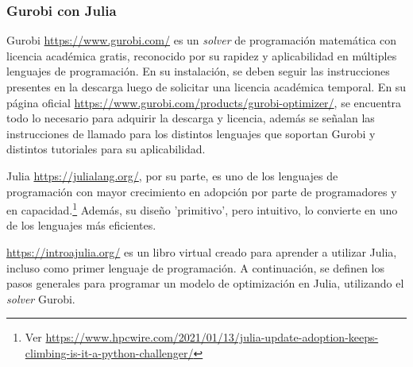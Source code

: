 \subsubsection{Gurobi con Julia}\label{mtjulia}

Gurobi \url{https://www.gurobi.com/} es un \textit{solver} de programación matemática con licencia académica gratis, reconocido por su rapidez y aplicabilidad en múltiples lenguajes de programación. En su instalación, se deben seguir las instrucciones presentes en la descarga luego de solicitar una licencia académica temporal. En su página oficial \url{https://www.gurobi.com/products/gurobi-optimizer/}, se encuentra todo lo necesario para adquirir la descarga y licencia, además se señalan las instrucciones de llamado para los distintos lenguajes que soportan Gurobi y distintos tutoriales para su aplicabilidad.
\vspace{2.5mm}

Julia \url{https://julialang.org/}, por su parte, es uno de los lenguajes de programación con mayor crecimiento en adopción por parte de programadores y en capacidad.\footnote{Ver {\tiny \url{ https://www.hpcwire.com/2021/01/13/julia-update-adoption-keeps-climbing-is-it-a-python-challenger/}}} Además, su diseño 'primitivo', pero intuitivo, lo convierte en uno de los lenguajes más eficientes. 
\vspace{2.5mm}

\url{https://introajulia.org/}  es un libro virtual creado para aprender a utilizar Julia, incluso como primer lenguaje de programación. A continuación, se definen los pasos generales para programar un modelo de optimización en Julia, utilizando el \textit{solver} Gurobi. 


